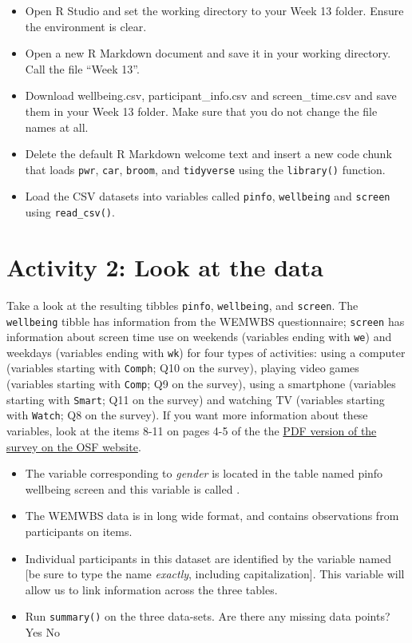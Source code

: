 \documentclass[]{book}
\providecommand{\tightlist}{%
  \setlength{\itemsep}{0pt}\setlength{\parskip}{0pt}}
\begin{document}
\begin{itemize}
\tightlist
\item
  Open R Studio and set the working directory to your Week 13 folder. Ensure the environment is clear.\\
\item
  Open a new R Markdown document and save it in your working directory. Call the file ``Week 13''.\\
\item
  Download wellbeing.csv, participant\_info.csv and screen\_time.csv and save them in your Week 13 folder. Make sure that you do not change the file names at all.\\
\item
  Delete the default R Markdown welcome text and insert a new code chunk that loads \texttt{pwr}, \texttt{car}, \texttt{broom}, and \texttt{tidyverse} using the \texttt{library()} function.
\item
  Load the CSV datasets into variables called \texttt{pinfo}, \texttt{wellbeing} and \texttt{screen} using \texttt{read\_csv()}.
\end{itemize}

\hypertarget{activity-2-look-at-the-data-3}{%
\section{Activity 2: Look at the data}\label{activity-2-look-at-the-data-3}}

Take a look at the resulting tibbles \texttt{pinfo}, \texttt{wellbeing}, and \texttt{screen}. The \texttt{wellbeing} tibble has information from the WEMWBS questionnaire; \texttt{screen} has information about screen time use on weekends (variables ending with \texttt{we}) and weekdays (variables ending with \texttt{wk}) for four types of activities: using a computer (variables starting with \texttt{Comph}; Q10 on the survey), playing video games (variables starting with \texttt{Comp}; Q9 on the survey), using a smartphone (variables starting with \texttt{Smart}; Q11 on the survey) and watching TV (variables starting with \texttt{Watch}; Q8 on the survey). If you want more information about these variables, look at the items 8-11 on pages 4-5 of the the \href{https://osf.io/82ybd/}{PDF version of the survey on the OSF website}.

\begin{itemize}
\item
  The variable corresponding to \emph{gender} is located in the table named pinfo wellbeing screen and this variable is called .
\item
  The WEMWBS data is in long wide format, and contains observations from participants on items.
\item
  Individual participants in this dataset are identified by the variable named {[}be sure to type the name \emph{exactly}, including capitalization{]}. This variable will allow us to link information across the three tables.
\item
  Run \texttt{summary()} on the three data-sets. Are there any missing data points? Yes No
\end{itemize}
\end{document}
